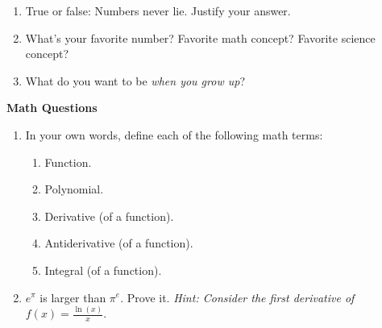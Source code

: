 \documentclass[12 pt]{article}
\newcommand{\ti}[1]{\textit{#1}}
\begin{document}
\begin{enumerate}[leftmargin=-0.25in, rightmargin=-0.25in]
\item True or false: Numbers never lie. Justify your answer.\vspace{0.125in}

\item What's your favorite number? Favorite math concept? Favorite science concept?\vspace{0.125in}

\item What do you want to be \ti{when you grow up}?
\end{enumerate}

\newpage

\hspace{-0.75in}\textbf{Math Questions}
\begin{enumerate}[resume, leftmargin=-0.25in, rightmargin=-0.25in]
\item In your own words, define each of the following math terms:
\begin{enumerate}
\item Function.\vspace{0.25in}
\item Polynomial.\vspace{0.25in}
\item Derivative (of a function).\vspace{0.25in}
\item Antiderivative (of a function).\vspace{0.25in}
\item Integral (of a function).\vspace{0.25in}
\end{enumerate}

\item$e^\pi$ is larger than $\pi^e$. Prove it. \ti{Hint: Consider the first derivative of $f(x)=\frac{\ln(x)}{x}$}.\vspace{0.5in}



\end{enumerate}
\end{document}

